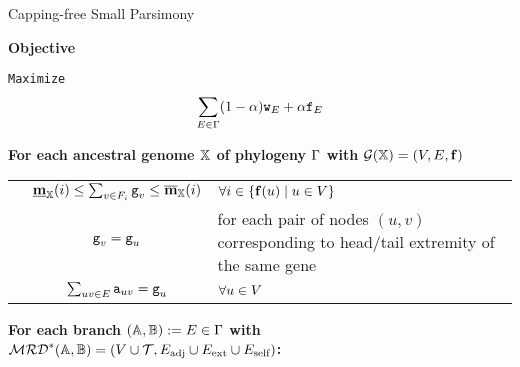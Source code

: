 
\begin{algorithm}[tbh]
\caption{Capping-free Small Parsimony}
\textbf{Objective}

\newcommand{\idx}{\texttt{ix}}
\hspace{0.5cm}\texttt{Maximize} 
\begin{equation*}
    \sum_{E \in\Gamma} (1-\alpha) {\texttt{w}}_E + \alpha {\texttt{f}}_E 
\end{equation*}


\textbf{For each ancestral genome $\mathbb{X}$ of phylogeny $\Gamma$ with $\mathcal{G}(\mathbb{X}) = (V, E, \mathbf{f})$}

\begin{constraints}
\begin{tabular}{lcl}
    \cns \label{c:cn} & $\underline{\mathbf{m}}_{\mathbb{X}}(i) \leq \sum_{v \in F_i} {\texttt{g}}_v \leq \overline{\mathbf{m}}_{\mathbb{X}}(i)$ & $\forall i \in \{\mathbf{f}(u) \mid u \in V\}$\\
    \cns \label{c:cn_consistent}& ${\texttt{g}}_v = {\texttt{g}}_u$ & for each pair of nodes $(u, v)$ corresponding to head/tail extremity of the same gene\todoDIn{improve}\\
    \cns \label{c:genome}& $\sum_{uv \in E} {\texttt{a}}_{uv} = {\texttt{g}}_u$ & $\forall u \in V$\\
\end{tabular}
\end{constraints}

\medskip
{}

\textbf{For each branch $(\mathbb{A},\mathbb{B}):=E\in \Gamma$ with $\mathcal{MRD}^*(\mathbb{A},\mathbb{B}) = (V\cup\mathcal{T}, {E}_\text{adj} \cup {E}_{\text{ext}} \cup {E}_\text{self})$:}

\begin{constraints}
\begin{tabular}{lcl}


\end{tabular}
\end{constraints}
\end{algorithm}
